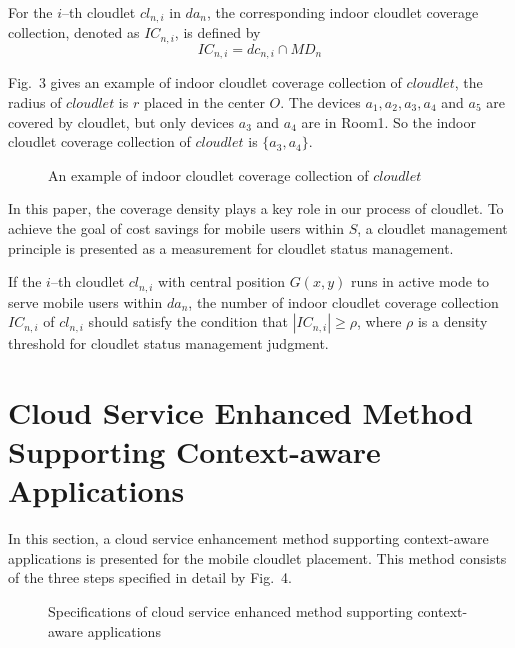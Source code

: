 \documentclass{llncs}
\begin{document}
\begin{definition}
For the $i$--th cloudlet $cl_{n,i}$ in $da_n$, the corresponding indoor cloudlet coverage collection, denoted as $IC_{n,i}$, is defined by
\begin{equation}
  IC_{n,i} = dc_{n,i} \cap MD_n
\end{equation}
\end{definition}

Fig.~3 gives an example of indoor cloudlet coverage collection of $cloudlet$, the radius of $cloudlet$ is $r$ placed in the center $O$. The devices $a_1, a_2, a_3, a_4$ and $a_5$ are covered by cloudlet, but only devices $a_3$ and $a_4$ are in Room1. So the indoor cloudlet coverage collection of $cloudlet$ is $\{a_3, a_4\}$.

\begin{figure}
\centering
{}
\caption{An example of indoor cloudlet coverage collection of $cloudlet$}
\end{figure}

In this paper, the coverage density plays a key role in our process of cloudlet. To achieve the goal of cost savings for mobile users within $S$, a cloudlet management principle is presented as a measurement for cloudlet status management.

\begin{definition}
If the $i$--th cloudlet $cl_{n,i}$ with central position $G(x, y)$ runs in active mode to serve mobile users within $da_n$, the number of indoor cloudlet coverage collection $IC_{n,i}$ of $cl_{n,i}$ should satisfy the condition that $\left|IC_{n,i}\right| \geq \rho$, where $\rho$ is a density threshold for cloudlet status management judgment.
\end{definition}
%
\section{Cloud Service Enhanced Method Supporting Context-aware Applications}
%
In this section, a cloud service enhancement method supporting context-aware applications is presented for the mobile cloudlet placement. This method consists of the three steps specified in detail by Fig.~4.

\begin{figure}
\centering
{}
\caption{Specifications of cloud service enhanced method supporting context-aware applications}
\end{figure}
%
\end{document}
